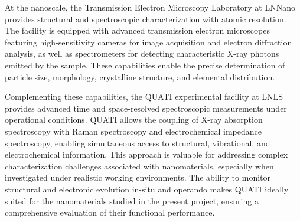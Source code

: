 At the nanoscale, the Transmission Electron Microscopy Laboratory at LNNano provides structural and spectroscopic characterization with atomic resolution. The facility is equipped with advanced transmission electron microscopes featuring high-sensitivity cameras for image acquisition and electron diffraction analysis, as well as spectrometers for detecting characteristic X-ray photons emitted by the sample. These capabilities enable the precise determination of particle size, morphology, crystalline structure, and elemental distribution.

Complementing these capabilities, the QUATI experimental facility at LNLS provides advanced time and space-resolved spectroscopic measurements under operational conditions. QUATI allows the coupling of X-ray absorption spectroscopy with Raman spectroscopy and electrochemical impedance spectroscopy, enabling simultaneous access to structural, vibrational, and electrochemical information. This approach is valuable for addressing complex characterization challenges associated with nanomaterials, especially when investigated under realistic working environments. The ability to monitor structural and electronic evolution in-situ and operando makes QUATI ideally suited for the nanomaterials studied in the present project, ensuring a comprehensive evaluation of their functional performance.
